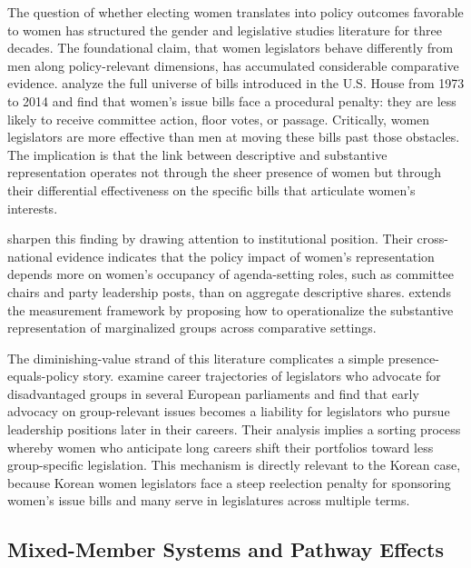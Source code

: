 \documentclass[11pt]{article}
\begin{document}
The question of whether electing women translates into policy outcomes favorable to women has structured the gender and legislative studies literature for three decades. The foundational claim, that women legislators behave differently from men along policy-relevant dimensions, has accumulated considerable comparative evidence. \citet{voldenWisemanWittmer2016} analyze the full universe of bills introduced in the U.S. House from 1973 to 2014 and find that women's issue bills face a procedural penalty: they are less likely to receive committee action, floor votes, or passage. Critically, women legislators are more effective than men at moving these bills past those obstacles. The implication is that the link between descriptive and substantive representation operates not through the sheer presence of women but through their differential effectiveness on the specific bills that articulate women's interests.

\citet{liuBanaszak2016} sharpen this finding by drawing attention to institutional position. Their cross-national evidence indicates that the policy impact of women's representation depends more on women's occupancy of agenda-setting roles, such as committee chairs and party leadership posts, than on aggregate descriptive shares. \citet{kroeber2018} extends the measurement framework by proposing how to operationalize the substantive representation of marginalized groups across comparative settings.

The diminishing-value strand of this literature complicates a simple presence-equals-policy story. \citet{bailerEtAl2021} examine career trajectories of legislators who advocate for disadvantaged groups in several European parliaments and find that early advocacy on group-relevant issues becomes a liability for legislators who pursue leadership positions later in their careers. Their analysis implies a sorting process whereby women who anticipate long careers shift their portfolios toward less group-specific legislation. This mechanism is directly relevant to the Korean case, because Korean women legislators face a steep reelection penalty for sponsoring women's issue bills \citep{shim2021b} and many serve in legislatures across multiple terms.

\subsection{Mixed-Member Systems and Pathway Effects}
\end{document}

